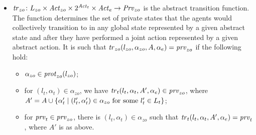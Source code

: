 \begin{definition}
\begin{itemize}[$\bullet$]
    \item $\mathit{tr}_{zo} \colon L_{zo} \times \mathit{Act}_{zo} \times 2^{\mathit{Act}_{t}} 
    \times \mathit{Act}_{e} \rightarrow \mathit{Prv}_{zo}$ is the abstract transition function.
    The function determines the set of private states that the agents would
    collectively transition to in any global state represented by a given
    abstract state and after they have performed a joint action represented by a
    given abstract action. It is such that $\mathit{tr}_{zo}(l_{zo}, \alpha_{zo}, A, \alpha_e)
    = \mathit{prv}_{zo}$ if the following hold:
    \begin{itemize}[\textbf{--}]
    \item $\alpha_{zo} \in \mathit{prot}_{zo}(l_{zo})$; 
    \item for $(l_t, \alpha_t) \in \alpha_{zo}$, we have
      $\mathit{tr}_{t}(l_t, \alpha_t, A', \alpha_e) \in \mathit{prv}_{zo}$, where
      $A' = A \cup \left \{ \alpha'_t \mid (l'_t, \alpha'_t) \in \alpha_{zo} \text{
          for some } l'_t \in L_{t} \right \}$;
    \item for $\mathit{prv}_{t} \in \mathit{prv}_{zo}$, there is
      $(l_t, \alpha_t) \in \alpha_{zo}$ such that
      $\mathit{tr}_{t}(l_t, \alpha_t, A', \alpha_e) = \mathit{prv}_{t}$, where $A'$ is as above.
    \end{itemize}
\end{itemize}
\end{definition}

